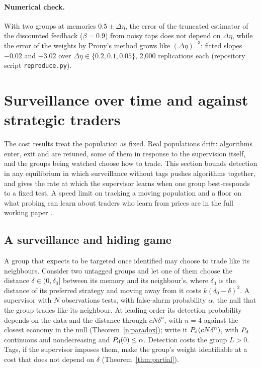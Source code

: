 \documentclass[12pt]{article}
\theoremstyle{definition}
\theoremstyle{remark}
\begin{document}
\paragraph{Numerical check.} With two groups at memories $0.5\pm\Delta\eta$, the error of the truncated estimator of the discounted feedback ($\beta=0.9$) from noisy taps does not depend on $\Delta\eta$, while the error of the weights by Prony's method grows like $(\Delta\eta)^{-3}$: fitted slopes $-0.02$ and $-3.02$ over $\Delta\eta\in\{0.2,0.1,0.05\}$, 2,000 replications each (repository script \nolinkurl{reproduce.py}).

\section{Surveillance over time and against strategic traders}\label{app:dynamic}

The cost results treat the population as fixed. Real populations drift: algorithms enter, exit and are retuned, some of them in response to the supervision itself, and the groups being watched choose how to trade. This section bounds detection in any equilibrium in which surveillance without tags pushes algorithms together, and gives the rate at which the supervisor learns when one group best-responds to a fixed test. A speed limit on tracking a moving population and a floor on what probing can learn about traders who learn from prices are in the full working paper \citep{niroula2026full}.

\subsection{A surveillance and hiding game}

A group that expects to be targeted once identified may choose to trade like its neighbours. Consider two untagged groups and let one of them choose the distance $\delta\in(0,\delta_0]$ between its memory and its neighbour's, where $\delta_0$ is the distance of its preferred strategy and moving away from it costs $k(\delta_0-\delta)^2$. A supervisor with $N$ observations tests, with false-alarm probability $\alpha$, the null that the group trades like its neighbour. At leading order its detection probability depends on the data and the distance through $cN\delta^n$, with $n=4$ against the closest economy in the null (Theorem~\ref{n:paradox}); write it $P_{\rm d}(cN\delta^n)$, with $P_{\rm d}$ continuous and nondecreasing and $P_{\rm d}(0)\le\alpha$. Detection costs the group $L>0$. Tags, if the supervisor imposes them, make the group's weight identifiable at a cost that does not depend on $\delta$ (Theorem~\ref{thm:partial}).
\end{document}
